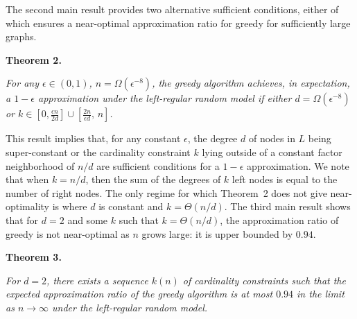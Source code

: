The second main result provides two alternative sufficient conditions, either of which ensures a near-optimal approximation ratio for greedy for sufficiently large graphs.\par





\par\medskip\noindent\textbf{\textbf{Theorem 2}\textbf{.}}\par



\emph{For any $\epsilon\in(0,1)$, $n=\Omega(\epsilon^{-8})$, the greedy algorithm achieves, in expectation, a $1-\epsilon$ approximation under the left-regular random model if either $d=\Omega(\epsilon^{-8})$ or $k\in\left[0,\frac{\epsilon n}{2d}\right]\cup\left[\frac{2n}{\epsilon d},\,n\right]$.}\par






This result implies that, for any constant $\epsilon$, the degree $d$ of nodes in $L$ being super-constant or the cardinality constraint $k$ lying outside of a constant factor neighborhood of $n/d$ are sufficient conditions for a $1-\epsilon$ approximation. We note that when $k=n/d$, then the sum of the degrees of $k$ left nodes is equal to the number of right nodes. The only regime for which Theorem 2 does not give near-optimality is where $d$ is constant and $k=\Theta(n/d)$. The third main result shows that for $d=2$ and some $k$ such that $k=\Theta(n/d)$, the approximation ratio of greedy is not near-optimal as $n$ grows large: it is upper bounded by $0.94$.\par





\par\medskip\noindent\textbf{\textbf{Theorem 3}\textbf{.}}\par



\emph{For $d=2$, there exists a sequence $k(n)$ of cardinality constraints such that the expected approximation ratio of the greedy algorithm is at most $0.94$ in the limit as $n\rightarrow\infty$ under the left-regular random model.}\par






